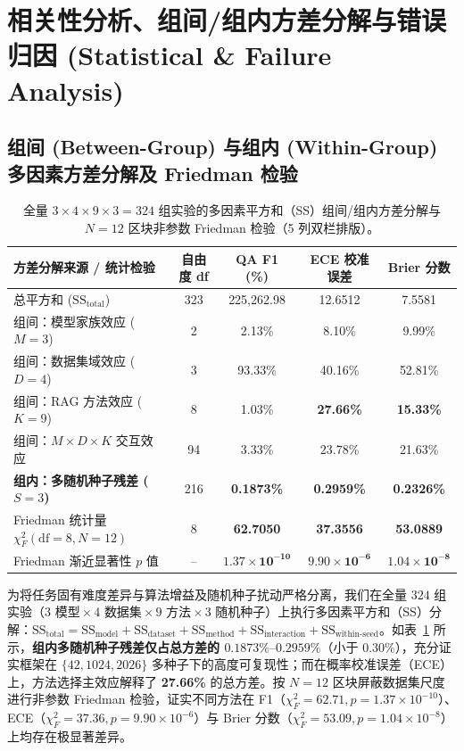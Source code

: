 \documentclass[11pt]{article}
\begin{document}
\section{相关性分析、组间/组内方差分解与错误归因 (Statistical \& Failure Analysis)}

\subsection{组间 (Between-Group) 与组内 (Within-Group) 多因素方差分解及 Friedman 检验}

\begin{table}[t]
\centering
\small
\setlength{\tabcolsep}{8pt}
\caption{全量 $3 \times 4 \times 9 \times 3 = 324$ 组实验的多因素平方和（SS）组间/组内方差分解与 $N=12$ 区块非参数 Friedman 检验（5 列双栏排版）。}
\label{tab:zh_anova}
\begin{tabular}{lcccc}
\toprule
\textbf{方差分解来源 / 统计检验} & \textbf{自由度 df} & \textbf{QA F1 (\%)} & \textbf{ECE 校准误差} & \textbf{Brier 分数} \\
\midrule
总平方和 ($\text{SS}_{\text{total}}$) & 323 & 225,262.98 & 12.6512 & 7.5581 \\
\midrule
组间：模型家族效应 ($M=3$) & 2 & 2.13\% & 8.10\% & 9.99\% \\
组间：数据集域效应 ($D=4$) & 3 & 93.33\% & 40.16\% & 52.81\% \\
组间：RAG 方法效应 ($K=9$) & 8 & 1.03\% & \textbf{27.66\%} & \textbf{15.33\%} \\
组间：$M \times D \times K$ 交互效应 & 94 & 3.33\% & 23.78\% & 21.63\% \\
\textbf{组内：多随机种子残差 ($S=3$)} & 216 & \textbf{0.1873\%} & \textbf{0.2959\%} & \textbf{0.2326\%} \\
\midrule
Friedman 统计量 $\chi_F^2(\text{df}=8, N=12)$ & 8 & \textbf{62.7050} & \textbf{37.3556} & \textbf{53.0889} \\
Friedman 渐近显著性 $p$ 值 & -- & $\mathbf{1.37 \times 10^{-10}}$ & $\mathbf{9.90 \times 10^{-6}}$ & $\mathbf{1.04 \times 10^{-8}}$ \\
\bottomrule
\end{tabular}
\end{table}

为将任务固有难度差异与算法增益及随机种子扰动严格分离，我们在全量 $324$ 组实验（$3\text{ 模型} \times 4\text{ 数据集} \times 9\text{ 方法} \times 3\text{ 随机种子}$）上执行多因素平方和（SS）分解：$\text{SS}_{\text{total}} = \text{SS}_{\text{model}} + \text{SS}_{\text{dataset}} + \text{SS}_{\text{method}} + \text{SS}_{\text{interaction}} + \text{SS}_{\text{within-seed}}$。如表~\ref{tab:zh_anova} 所示，\textbf{组内多随机种子残差仅占总方差的 $0.1873\%\text{--}0.2959\%$}（小于 $0.30\%$），充分证实框架在 $\{42, 1024, 2026\}$ 多种子下的高度可复现性；而在概率校准误差（ECE）上，方法选择主效应解释了 \textbf{27.66\%} 的总方差。按 $N=12$ 区块屏蔽数据集尺度进行非参数 Friedman 检验，证实不同方法在 F1（$\chi_F^2=62.71, p=1.37\times 10^{-10}$）、ECE（$\chi_F^2=37.36, p=9.90\times 10^{-6}$）与 Brier 分数（$\chi_F^2=53.09, p=1.04\times 10^{-8}$）上均存在极显著差异。
\end{document}
